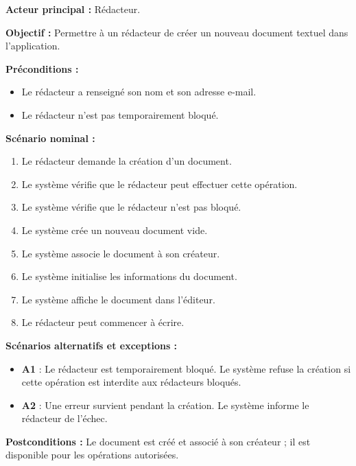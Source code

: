 \begin{description}[leftmargin=0pt, style=nextline, font=\normalfont\bfseries\color{violetprincipal}]
    \item[UC02 --- Créer un document]

    \textbf{Acteur principal :} Rédacteur.

    \textbf{Objectif :} Permettre à un rédacteur de créer un nouveau document textuel dans l'application.

    \textbf{Préconditions :}
    \begin{itemize}
        \item Le rédacteur a renseigné son nom et son adresse e-mail.
        \item Le rédacteur n'est pas temporairement bloqué.
    \end{itemize}

    \textbf{Scénario nominal :}
    \begin{enumerate}
        \item Le rédacteur demande la création d'un document.
        \item Le système vérifie que le rédacteur peut effectuer cette opération.
        \item Le système vérifie que le rédacteur n'est pas bloqué.
        \item Le système crée un nouveau document vide.
        \item Le système associe le document à son créateur.
        \item Le système initialise les informations du document.
        \item Le système affiche le document dans l'éditeur.
        \item Le rédacteur peut commencer à écrire.
    \end{enumerate}

    \textbf{Scénarios alternatifs et exceptions :}
    \begin{itemize}
        \item \textbf{A1} : Le rédacteur est temporairement bloqué. Le système refuse la création si cette opération est interdite aux rédacteurs bloqués.
        \item \textbf{A2} : Une erreur survient pendant la création. Le système informe le rédacteur de l'échec.
    \end{itemize}

    \textbf{Postconditions :} Le document est créé et associé à son créateur ; il est disponible pour les opérations autorisées.

    \item[UC03 --- Inviter des collaborateurs]


\end{description}
